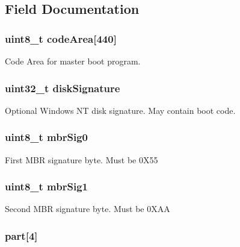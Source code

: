 \subsection{Field Documentation}
\hypertarget{structmaster_boot_record_a714f552faf0b0f09ffc53e2ba52ddbc3}{
\subsubsection[{code\-Area}]{\setlength{\rightskip}{0pt plus 5cm}uint8\-\_\-t code\-Area\mbox{[}440\mbox{]}}}\label{structmaster_boot_record_a714f552faf0b0f09ffc53e2ba52ddbc3}
Code Area for master boot program. \hypertarget{structmaster_boot_record_a6a40348b3b308847ba21a75829d91871}{
\subsubsection[{disk\-Signature}]{\setlength{\rightskip}{0pt plus 5cm}uint32\-\_\-t disk\-Signature}}\label{structmaster_boot_record_a6a40348b3b308847ba21a75829d91871}
Optional Windows N\-T disk signature. May contain boot code. \hypertarget{structmaster_boot_record_aa5633d8ea0049be26315e7627e32bb4e}{
\subsubsection[{mbr\-Sig0}]{\setlength{\rightskip}{0pt plus 5cm}uint8\-\_\-t mbr\-Sig0}}\label{structmaster_boot_record_aa5633d8ea0049be26315e7627e32bb4e}
First M\-B\-R signature byte. Must be 0\-X55 \hypertarget{structmaster_boot_record_af106928fafe93a641c06cfb87b0d24e3}{
\subsubsection[{mbr\-Sig1}]{\setlength{\rightskip}{0pt plus 5cm}uint8\-\_\-t mbr\-Sig1}}\label{structmaster_boot_record_af106928fafe93a641c06cfb87b0d24e3}
Second M\-B\-R signature byte. Must be 0\-X\-A\-A \hypertarget{structmaster_boot_record_aa65f87792f271fc6cfa70980af6ac3dd}{
\subsubsection[{part}]{ part\mbox{[}4\mbox{]}}}\label{structmaster_boot_record_aa65f87792f271fc6cfa70980af6ac3dd}
